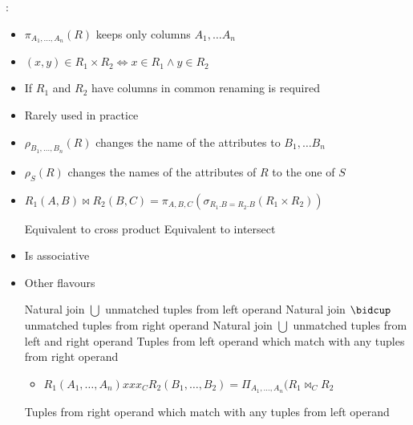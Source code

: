 \begin{itemize}
\begin{itemize}
            :
                \begin{itemize}
                    \item $\pi_{A_1,\dots,A_n} (R)$ keeps only columns $A_1, \dots A_n$
                \end{itemize}
                \begin{itemize}
                    \item $(x, y) \in R_1 \times R_2 \iff x \in R_1 \land y \in R_2$
                    \item If $R_1$ and $R_2$ have columns in common renaming is required
                    \item Rarely used in practice
                \end{itemize}
                \begin{itemize}
                    \item $\rho_{B_1, \dots, B_n} (R)$ changes the name of the attributes to $B_1, \dots B_n$
                    \item $\rho_S(R)$ changes the names of the attributes of $R$ to the one of $S$
                \end{itemize}
                \begin{itemize}
                    \item $R_1 (A, B) \bowtie R_2 (B, C) = \pi_{A, B, C} (\sigma_{R_1.B = R_2.B}(R_1 \times R_2))$
                            \begin{itemize}
                                 Equivalent to cross product
                                 Equivalent to intersect
                            \end{itemize}
                    \item Is associative
                    \item Other flavours
                        \begin{itemize}
                             Natural join $\bigcup$ unmatched tuples from left operand
                             Natural join $\bidcup$ unmatched tuples from right operand
                             Natural join $\bigcup$ unmatched tuples from left and right operand
                             Tuples from left operand which match with any tuples from right operand
                                \begin{itemize}
                                    \item $R_1(A_1, \dots, A_n) xxx_C R_2(B_1, \dots, B_2) = \Pi_{A_1, \dots, A_n}(R_1 \bowtie_C R_2$
                                \end{itemize}
                             Tuples from right operand which match with any tuples from left operand


\end{itemize}
\end{itemize}
\end{itemize}
\end{itemize}
